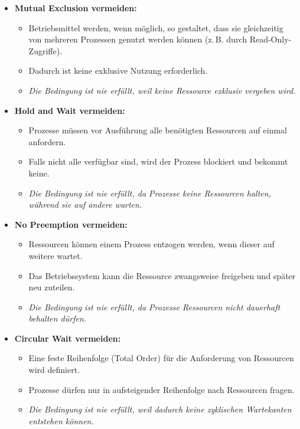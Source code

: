 \documentclass[a4paper,12pt]{article}
\begin{document}
\begin{itemize}
  \item \textbf{Mutual Exclusion vermeiden:}
  \begin{itemize}
    \item Betriebsmittel werden, wenn möglich, so gestaltet, dass sie gleichzeitig von mehreren Prozessen genutzt werden können (z.\,B. durch Read-Only-Zugriffe).
    \item Dadurch ist keine exklusive Nutzung erforderlich.
    \item \textit{Die Bedingung ist nie erfüllt, weil keine Ressource exklusiv vergeben wird.}
  \end{itemize}

  \item \textbf{Hold and Wait vermeiden:}
  \begin{itemize}
    \item Prozesse müssen vor Ausführung alle benötigten Ressourcen auf einmal anfordern.
    \item Falls nicht alle verfügbar sind, wird der Prozess blockiert und bekommt keine.
    \item \textit{Die Bedingung ist nie erfüllt, da Prozesse keine Ressourcen halten, während sie auf andere warten.}
  \end{itemize}

  \item \textbf{No Preemption vermeiden:}
  \begin{itemize}
    \item Ressourcen können einem Prozess entzogen werden, wenn dieser auf weitere wartet.
    \item Das Betriebssystem kann die Ressource zwangsweise freigeben und später neu zuteilen.
    \item \textit{Die Bedingung ist nie erfüllt, da Prozesse Ressourcen nicht dauerhaft behalten dürfen.}
  \end{itemize}

  \item \textbf{Circular Wait vermeiden:}
  \begin{itemize}
    \item Eine feste Reihenfolge (Total Order) für die Anforderung von Ressourcen wird definiert.
    \item Prozesse dürfen nur in aufsteigender Reihenfolge nach Ressourcen fragen.
    \item \textit{Die Bedingung ist nie erfüllt, weil dadurch keine zyklischen Wartekanten entstehen können.}
  \end{itemize}
\end{itemize}
\end{document}
